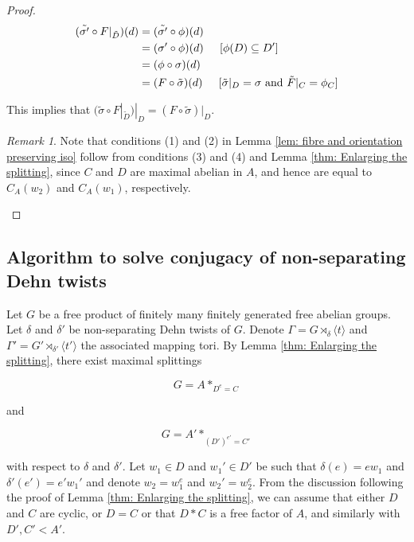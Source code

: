 \documentclass{amsart}
\theoremstyle{plain}
\theoremstyle{definition}
\theoremstyle{remark}
\newtheorem{rmk}[thm]{Remark}
\begin{document}
\begin{proof}
\begin{align*}
(\tilde{\sigma'} \circ F|_{\tilde{D}})(d) &= (\tilde{\sigma'} \circ \phi)(d) \\
&= (\sigma' \circ \phi)(d) \hspace {0.2in} [\phi(D) \subseteq D']\\
&= (\phi \circ \sigma)(d) \\
&= (F \circ \tilde{\sigma})(d) \hspace {0.2in} [\tilde{\sigma} \vert_D = \sigma \text{ and } \tilde{F} \vert_C = \phi_C]\\
\end{align*}

\noindent This implies that $(\tilde{\sigma} \circ F|_{\tilde{D}})|_D = (F \circ \tilde{\sigma})|_D$.

\begin{rmk}
    \label{rmk: Simplified conditions for non-sep suff conditions lemma}
    Note that conditions (1) and (2) in Lemma \ref{lem: fibre and orientation preserving iso} follow from conditions (3) and (4) and Lemma \ref{thm: Enlarging the splitting}, since $C$ and $D$ are maximal abelian in $A$, and hence are equal to $C_A(w_2)$ and $C_A(w_1)$, respectively. 
\end{rmk}
    
\end{proof}

\subsection{Algorithm to solve conjugacy of non-separating Dehn twists}
\label{section: algorithm for non-separating Dehn twists}

Let $G$ be a free product of finitely many finitely generated free abelian groups. Let $\delta$ and $\delta'$ be non-separating Dehn twists of $G$. Denote $\Gamma = G \rtimes_{\delta} \langle t \rangle$ and $\Gamma' = G' \rtimes_{\delta'} \langle t' \rangle$ the associated mapping tori. By Lemma \ref{thm: Enlarging the splitting}, there exist maximal splittings 

$$G = A*_{D^e = C}$$

and 

$$G = A'*_{(D')^{e'} = C'}$$

with respect to $\delta$ and $\delta'$. Let $w_1 \in D$ and $w_1' \in D'$ be such that $\delta(e) = ew_1$ and $\delta'(e') = e'w_1'$ and denote $w_2 = w_1^e$ and $w_2' = w_2^e$. From the discussion following the proof of Lemma \ref{thm: Enlarging the splitting}, we can assume that either $D$ and $C$ are cyclic, or $D=C$ or that $D*C$ is a free factor of $A$, and similarly with $D',C' < A'$. 
\end{document}
